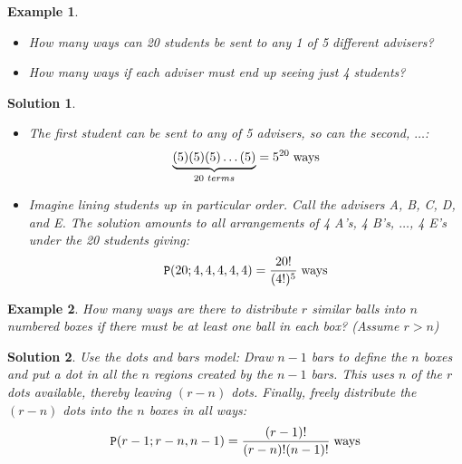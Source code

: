 \documentclass[12pt, letterpaper, onecolumn, conference, final]{IEEEtran}
\theoremstyle{definition}
\theoremstyle{plain}
\newtheorem{example}{Example}[section]
\newtheorem{solution}{Solution}[section]
\begin{document}
\newpage
\begin{example}
\hfill
\begin{itemize}

\item[(a)]
How many ways can 20 students be sent to any 1 of 5 different advisers?

\item[(b)]
How many ways if each adviser must end up seeing just 4 students?

\end{itemize}

\end{example}
\begin{solution}
\hfill
\begin{itemize}

\item[(a)]
The first student can be sent to any of 5 advisers, so can the second, $\dots$:
\begin{equation*}
\underbrace{(5)(5)(5) \dots (5)}_{20 \hspace{.1cm} terms} = 5^{20} \hspace{.1cm} \text{ways}
\end{equation*}

\vspace{.2cm}
\item[(ii)]
Imagine lining students up in particular order. Call the advisers A, B, C, D, and E. The solution amounts to all arrangements of 4 A's, 4 B's, $\dots$, 4 E's under the 20 students giving:
\begin{equation*}
\mathtt{P}(20;4,4,4,4,4) = \frac{20!}{(4!)^5} \hspace{.1cm} \text{ways}
\end{equation*}

\end{itemize}
\end{solution}

\begin{example}
How many ways are there to distribute $r$ similar balls into $n$ numbered boxes if there must be at least one ball in each box? (Assume $r > n$)
\end{example}
\begin{solution}
Use the dots and bars model: Draw $n-1$ bars to define the $n$ boxes and put a dot in all the $n$ regions created by the $n-1$ bars. This uses $n$ of the $r$ dots available, thereby leaving $(r-n)$ dots. Finally, freely distribute the $(r-n)$ dots into the $n$ boxes in all ways:
\begin{equation*}
\mathtt{P}(r-1;r-n,n-1) = \frac{(r-1)!}{(r-n)!(n-1)!} \hspace{.1cm} \text{ways}
\end{equation*}
\end{solution}
\end{document}
